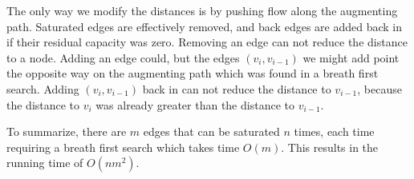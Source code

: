 The only way we modify the distances is by pushing flow along the augmenting path. Saturated edges are effectively removed, and back edges are added back in if their residual capacity was zero.
Removing an edge can not reduce the distance to a node. Adding an edge could, but the edges $(v_i, v_{i-1})$ we might add point the opposite way on the augmenting path which was found in a breath first search.
Adding $(v_i, v_{i-1})$ back in can not reduce the distance to $v_{i-1}$, because the distance to $v_i$ was already greater than the distance to $v_{i-1}$.

To summarize, there are $m$ edges that can be saturated $n$ times, each time requiring a breath first search which takes time $O(m)$.
This results in the running time of $O(nm^2)$.